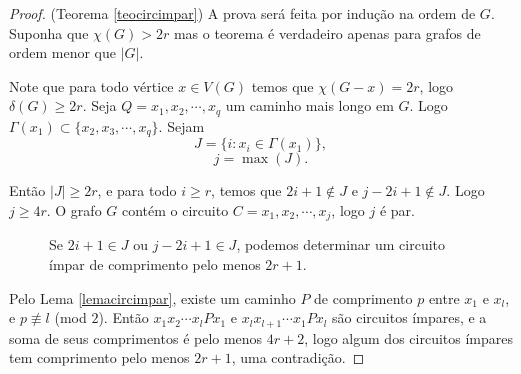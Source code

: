 \begin{proof}(Teorema \ref{teocircimpar})
A prova será feita por indução na ordem de $G$. Suponha que $\chi(G) > 2r$ mas o teorema é verdadeiro apenas para grafos de ordem menor que $|G|$.

Note que para todo vértice $x\in V(G)$ temos que $\chi(G - x) = 2r$, logo $\delta(G) \geq 2r$. Seja $Q = x_1,x_2,\cdots,x_q$ um caminho mais longo em $G$. Logo $\Gamma(x_1) \subset \{x_2,x_3,\cdots, x_q\}$. Sejam
\[J = \{i : x_i \in \Gamma(x_1)\},\]
\[j = \max(J).\]

Então $|J| \geq 2r$, e para todo $i\geq r$, temos que $2i+1\not\in J$ e $j-2i+1\not\in J$. Logo $j\geq 4r$. O grafo $G$ contém o circuito $C=x_1,x_2,\cdots,x_j$, logo $j$ é par.

\begin{figure}[H]
\centering
{}
\caption{Se $2i+1\in J$ ou $j-2i+1\in J$, podemos determinar um circuito ímpar de comprimento pelo menos $2r+1$.}
\label{fig:circimpar-j2r}
\end{figure}

Pelo Lema \ref{lemacircimpar}, existe um caminho $P$ de comprimento $p$ entre $x_1$ e $x_l$, e $p \not\equiv l$ (mod $2$). Então $x_1 x_2 \cdots x_l P x_1$ e $x_l x_{l+1} \cdots x_1 P x_l$ são circuitos ímpares, e a soma de seus comprimentos é pelo menos $4r+2$, logo algum dos circuitos ímpares tem comprimento pelo menos $2r+1$, uma contradição.
\end{proof}

